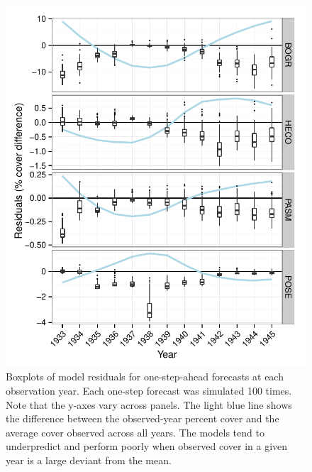 \documentclass[12pt]{article}
\begin{document}
\begin{figure}[th!]
\begin{center}
\includegraphics{Fig-ResidFig}
\end{center}
\caption{Boxplots of model residuals for one-step-ahead forecasts at each observation year. Each one-step forecast was simulated 100 times. Note that the y-axes vary across panels. The light blue line shows the difference between the observed-year percent cover and the average cover observed across all years. The models tend to underpredict and perform poorly when observed cover in a given year is a large deviant from the mean.}
\label{fig:ResidFig}
\end{figure}
\end{document}
